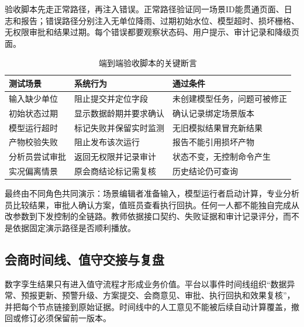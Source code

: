 验收脚本先走正常路径，再注入错误。正常路径验证同一场景ID能贯通页面、日志和报告；错误路径分别注入无单位降雨、过期初始水位、模型超时、损坏栅格、无权限审批和结果过期。每个错误都要观察状态码、用户提示、审计记录和降级页面。

\begin{table}[htbp]
\centering
\caption{端到端验收脚本的关键断言}
\label{tab:end-to-end-assertions}
\begin{tabular}{p{2.5cm}p{4.6cm}p{5.4cm}}
\toprule
测试场景 & 系统行为 & 通过条件 \\
\midrule
输入缺少单位 & 阻止提交并定位字段 & 未创建模型任务，问题可被修正 \\
初始状态过期 & 显示数据龄期并要求确认 & 确认记录绑定场景版本 \\
模型运行超时 & 标记失败并保留实时监测 & 无旧模拟结果冒充新结果 \\
产物校验失败 & 阻止发布该次运行 & 报告不能引用损坏产物 \\
分析员尝试审批 & 返回无权限并记录审计 & 状态不变，无控制命令产生 \\
实况偏离情景 & 原会商结论标记需复核 & 历史结论仍可查询 \\
\bottomrule
\end{tabular}
\end{table}

最终由不同角色共同演示：场景编辑者准备输入，模型运行者启动计算，专业分析员比较结果，审批人确认方案，值班员查看执行回执。任何一人都不能独自完成从改参数到下发控制的全链路。教师依据接口契约、失败证据和审计记录评分，而不是依据固定演示路径是否顺利播放。

\subsection{会商时间线、值守交接与复盘}

数字孪生结果只有进入值守流程才形成业务价值。平台以事件时间线组织“数据异常、预报更新、预警升级、方案提交、会商意见、审批、执行回执和效果复核”，并把每个节点链接到原始证据。时间线中的人工意见不能被后续自动计算覆盖，撤回或修订必须保留前一版本。

